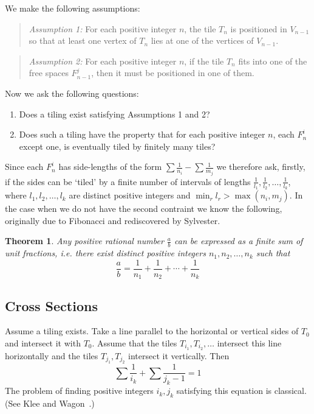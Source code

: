 \documentclass[11pt]{article}
\theoremstyle{plain}%
\newtheorem{thm}{Theorem}[section]
\theoremstyle{definition}
\theoremstyle{remark}
\numberwithin{equation}{section}
\begin{document}
We make the following assumptions:
\begin{quote}
{\it Assumption 1:}
For each positive integer $n$, the tile $T_n$ is positioned in $V_{n-1}$ so that at least one vertex of $T_n$ lies at one of the vertices of $V_{n-1}$.
\end{quote}
\begin{quote}
{\it Assumption 2:}
For each positive integer $n$, if the tile $T_n$ fits into one of the free spaces $F_{n-1}^j$, then it must be positioned in one of them.
\end{quote}
Now we ask the following questions:
\begin{enumerate}
\item Does a tiling exist satisfying Assumptions 1 and 2?
\item Does such a tiling have the property that for each positive integer $n$, each $F_n^i$ except one, is eventually tiled by finitely many tiles?
\end{enumerate}
Since each $F_n^i$ has side-lengths of the form $\sum \frac{1}{n_i}-\sum \frac{1}{m_j}$ we therefore ask, firstly, if the sides can be `tiled' by a finite number of intervals of lengths $\frac{1}{l_1},\frac{1}{l_2},\ldots,\frac{1}{l_k}$, where $l_1,l_2,\ldots,l_k$ are distinct positive integers and $\min_r l_r >\max (n_i,m_j)$.
In the case when we do not have the second contraint we know the following, originally due to Fibonacci and rediscovered by Sylvester.
\begin{thm}
Any positive rational number $\frac{a}{b}$ can be expressed as a finite sum of unit fractions, i.e. there exist distinct positive integers $n_1,n_2,\ldots,n_k$ such that
\begin{equation}
\frac{a}{b}=\frac{1}{n_1}+\frac{1}{n_2}+\cdots+\frac{1}{n_k}
\end{equation}
\end{thm}


\subsection{Cross Sections}
Assume a tiling exists. 
Take a line parallel to the horizontal or vertical sides of $T_0$ and intersect it with $T_0$.
Assume that the tiles $T_{i_1},T_{i_2},\ldots$ intersect this line horizontally and the tiles $T_{j_1},T_{j_2}$ intersect it vertically.
Then
\begin{equation}
\sum\frac{1}{i_k}+\sum\frac{1}{j_k-1}=1
\end{equation}
The problem of finding positive integers $i_k, j_k$ satisfying this equation is classical. 
(See Klee and Wagon~\cite[Chapter 2.15]{KleeWagon91}.)
\end{document}
